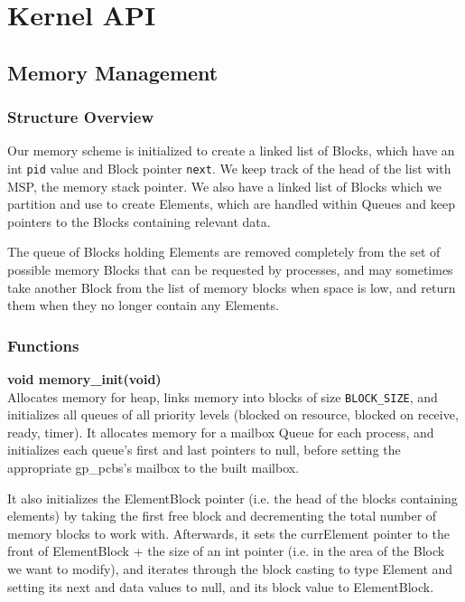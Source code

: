 \documentclass[11pt, oneside]{article}
\begin{document}
\begin{longtable}{|L{2cm}|L{5cm}|L{8cm}|}
\end{longtable}

\section{Kernel API}
\subsection{Memory Management}
\subsubsection{Structure Overview}
Our memory scheme is initialized to create a linked list of Blocks, which have an int {\tt pid} value and Block pointer {\tt next}. We keep track of the head of the list with MSP, the memory stack pointer. We also have a linked list of Blocks which we partition and use to create Elements, which are handled within Queues and keep pointers to the Blocks containing relevant data.

The queue of Blocks holding Elements are removed completely from the set of possible memory Blocks that can be requested by processes, and may sometimes take another Block from the list of memory blocks when space is low, and return them when they no longer contain any Elements.

\subsubsection{Functions}
{\bf void memory\_init(void)}\\
Allocates memory for heap, links memory into blocks of size {\tt BLOCK\_SIZE}, and initializes all queues of all priority levels (blocked on resource, blocked on receive, ready, timer). It allocates memory for a mailbox Queue for each process, and initializes each queue's first and last pointers to null, before setting the appropriate gp\_pcbs's mailbox to the built mailbox.

It also initializes the ElementBlock pointer (i.e. the head of the blocks containing elements) by taking the first free block and decrementing the total number of memory blocks to work with. Afterwards, it sets the currElement pointer to the front of ElementBlock + the size of an int pointer (i.e. in the area of the Block we want to modify), and iterates through the block casting to type Element and setting its next and data values to null, and its block value to ElementBlock.
\end{document}
